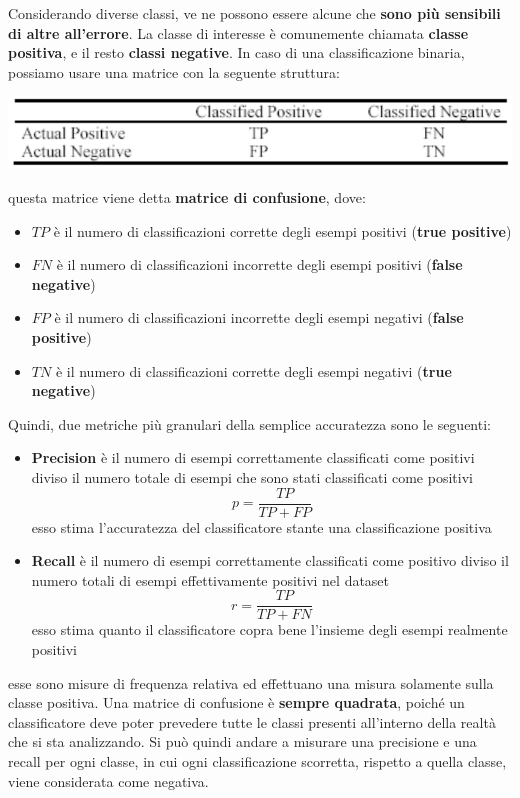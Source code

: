 \documentclass[12pt]{article}
\begin{document}
Considerando diverse classi, ve ne possono essere alcune che \textbf{sono più sensibili di altre all'errore}.
La classe di interesse è comunemente chiamata \textbf{classe positiva}, e il resto \textbf{classi negative}.
In caso di una classificazione binaria, possiamo usare una matrice con la seguente struttura:
\begin{center}
    \includegraphics[width =0.80\linewidth]{Images/79.PNG}
\end{center}
questa matrice viene detta \textbf{matrice di confusione}, dove:
\begin{itemize}
    \item $TP$ è il numero di classificazioni corrette degli esempi positivi (\textbf{true positive})
    \item $FN$ è il numero di classificazioni incorrette degli esempi positivi (\textbf{false negative})
    \item $FP$ è il numero di classificazioni incorrette degli esempi negativi (\textbf{false positive})
    \item $TN$ è il numero di classificazioni corrette degli esempi negativi (\textbf{true negative})
\end{itemize}
Quindi, due metriche più granulari della semplice accuratezza sono le seguenti:
\begin{itemize}
    \item \textbf{Precision} è il numero di esempi correttamente classificati come positivi diviso il numero totale di esempi che sono stati classificati come positivi
    $$p = \frac{TP}{TP + FP}$$
    esso stima l'accuratezza del classificatore stante una classificazione positiva
    \item \textbf{Recall} è il numero di esempi correttamente classificati come positivo diviso il numero totali di esempi effettivamente positivi nel dataset
    $$r = \frac{TP}{TP + FN}$$
    esso stima quanto il classificatore copra bene l'insieme degli esempi realmente positivi
\end{itemize}
esse sono misure di frequenza relativa ed effettuano una misura solamente sulla classe positiva.
Una matrice di confusione è \textbf{sempre quadrata}, poiché un classificatore deve poter prevedere tutte le classi presenti all'interno della realtà che si sta analizzando.
Si può quindi andare a misurare una precisione e una recall per ogni classe, in cui ogni classificazione scorretta, rispetto a quella classe, viene considerata come negativa.
\end{document}
